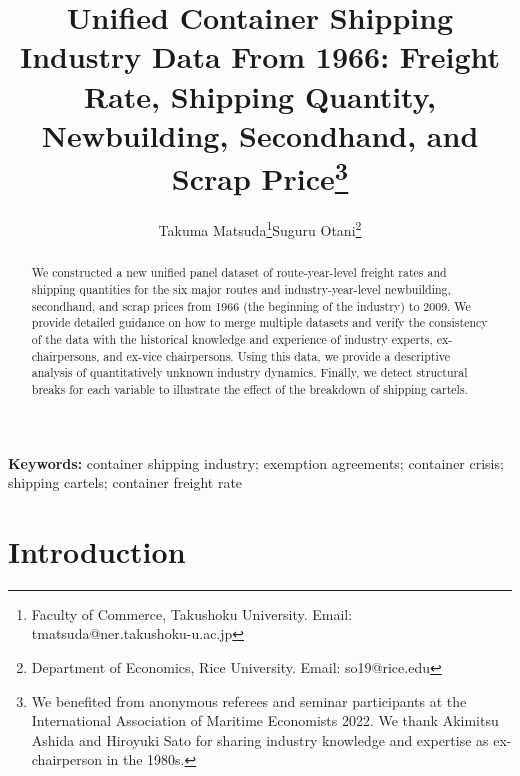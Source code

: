 \documentclass[11pt]{article}
\title{Unified Container Shipping Industry Data From 1966: Freight Rate, Shipping Quantity, Newbuilding, Secondhand, and Scrap Price\thanks{We benefited from anonymous referees and seminar participants at the International Association of Maritime Economists 2022. We thank Akimitsu Ashida and Hiroyuki Sato for sharing industry knowledge and expertise as ex-chairperson in the 1980s.}}
\author{Takuma Matsuda\thanks{Faculty of Commerce, Takushoku University. Email: tmatsuda@ner.takushoku-u.ac.jp}\quad  Suguru Otani\thanks{Department of Economics, Rice University. Email: so19@rice.edu}}
\begin{document}
\maketitle

\begin{abstract}
We constructed a new unified panel dataset of route-year-level freight rates and shipping quantities for the six major routes and industry-year-level newbuilding, secondhand, and scrap prices from 1966 (the beginning of the industry) to 2009. We provide detailed guidance on how to merge multiple datasets and verify the consistency of the data with the historical knowledge and experience of industry experts, ex-chairpersons, and ex-vice chairpersons. Using this data, we provide a descriptive analysis of quantitatively unknown industry dynamics. Finally, we detect structural breaks for each variable to illustrate the effect of the breakdown of shipping cartels.
\end{abstract} 

 \vspace{0.1in}
\noindent\textbf{Keywords:} container shipping industry; exemption agreements; container crisis; shipping cartels; container freight rate 
\vspace{0in}


\section{Introduction}\label{sec:introduction}
\end{document}
